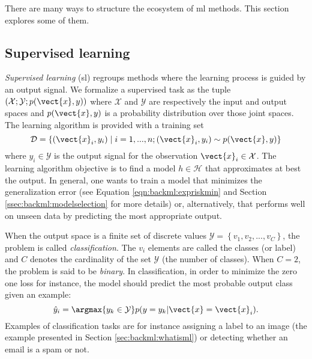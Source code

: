 There are many ways to structure the ecosystem of \acrlong{ml} methods. This
section explores some of them.

\subsection{Supervised learning}
\label{ssec:backml:sl}

\textit{Supervised learning} (\acrshort{sl}) regroups methods where the learning
process is guided by an output signal. We formalize a supervised task as the tuple
$\left(\mathcal{X}; \mathcal{Y}; p(\vect{x}, y)\right)$ where $\mathcal{X}$ and
$\mathcal{Y}$ are respectively the input and output spaces and $p(\vect{x}, y)$
is a probability distribution over those joint spaces. The learning algorithm is
provided with a training set
\begin{equation}
\label{eqn:backml:supervised}
\mathcal{D} = \left\{(\vect{x}_i, y_i) \mid i = 1,...,n ; (\vect{x}_i, y_i) \sim p(\vect{x}, y) \right\}
\end{equation}
where $y_i \in \mathcal{Y}$ is the output signal for the observation
$\vect{x}_i \in \mathcal{X}$. The learning algorithm objective is to find a model
$h \in \mathcal{H}$ that approximates at best the output. In general, one wants to train 
a model that minimizes the generalization error (see Equation \ref{eqn:backml:expriskmin} and 
Section \ref{ssec:backml:modelselection} for more details) or, alternatively, that 
performs well on unseen data by predicting the most appropriate output.

When the output space is a finite set of discrete values
$\mathcal{Y} = \left\{v_1, v_2, ..., v_C\right\}$, the problem is called
\textit{classification}. The $v_i$ elements are called the classes (or label) and
$C$ denotes the cardinality of the set $\mathcal{Y}$ (\ie the number of classes).
When $C = 2$, the problem is said to be \textit{binary}. In classification, in order to 
minimize the zero one loss for instance, the model should predict the most probable 
output class given an example:
\begin{equation}
\hat{y}_i = \argmax{y_k \in \mathcal{Y}} p(y=y_k|\vect{x}=\vect{x}_i).
\end{equation}
Examples of classification tasks are for instance assigning a label to an image (\ie the example presented in Section 
\ref{sec:backml:whatisml}) or detecting whether an email is a spam or not.

